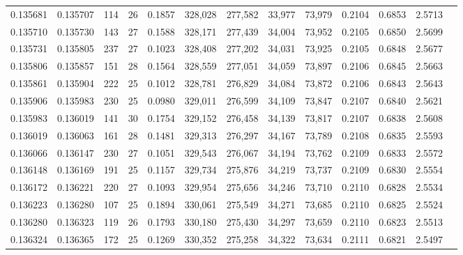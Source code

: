 \begin{tabular}{rrrrrrrrrrrrr}
0.135681 & 0.135707 & 114 &  26 &                                     0.1857 & 328,028 & 277,582 &  33,977 &  73,979 & 0.2104 & 0.6853 & 2.5713 \\
0.135710 & 0.135730 & 143 &  27 &                                     0.1588 & 328,171 & 277,439 &  34,004 &  73,952 & 0.2105 & 0.6850 & 2.5699 \\
0.135731 & 0.135805 & 237 &  27 &                                     0.1023 & 328,408 & 277,202 &  34,031 &  73,925 & 0.2105 & 0.6848 & 2.5677 \\
0.135806 & 0.135857 & 151 &  28 &                                     0.1564 & 328,559 & 277,051 &  34,059 &  73,897 & 0.2106 & 0.6845 & 2.5663 \\
0.135861 & 0.135904 & 222 &  25 &                                     0.1012 & 328,781 & 276,829 &  34,084 &  73,872 & 0.2106 & 0.6843 & 2.5643 \\
0.135906 & 0.135983 & 230 &  25 &                                     0.0980 & 329,011 & 276,599 &  34,109 &  73,847 & 0.2107 & 0.6840 & 2.5621 \\
0.135983 & 0.136019 & 141 &  30 &                                     0.1754 & 329,152 & 276,458 &  34,139 &  73,817 & 0.2107 & 0.6838 & 2.5608 \\
0.136019 & 0.136063 & 161 &  28 &                                     0.1481 & 329,313 & 276,297 &  34,167 &  73,789 & 0.2108 & 0.6835 & 2.5593 \\
0.136066 & 0.136147 & 230 &  27 &                                     0.1051 & 329,543 & 276,067 &  34,194 &  73,762 & 0.2109 & 0.6833 & 2.5572 \\
0.136148 & 0.136169 & 191 &  25 &                                     0.1157 & 329,734 & 275,876 &  34,219 &  73,737 & 0.2109 & 0.6830 & 2.5554 \\
0.136172 & 0.136221 & 220 &  27 &                                     0.1093 & 329,954 & 275,656 &  34,246 &  73,710 & 0.2110 & 0.6828 & 2.5534 \\
0.136223 & 0.136280 & 107 &  25 &                                     0.1894 & 330,061 & 275,549 &  34,271 &  73,685 & 0.2110 & 0.6825 & 2.5524 \\
0.136280 & 0.136323 & 119 &  26 &                                     0.1793 & 330,180 & 275,430 &  34,297 &  73,659 & 0.2110 & 0.6823 & 2.5513 \\
0.136324 & 0.136365 & 172 &  25 &                                     0.1269 & 330,352 & 275,258 &  34,322 &  73,634 & 0.2111 & 0.6821 & 2.5497 \\

\end{tabular}
